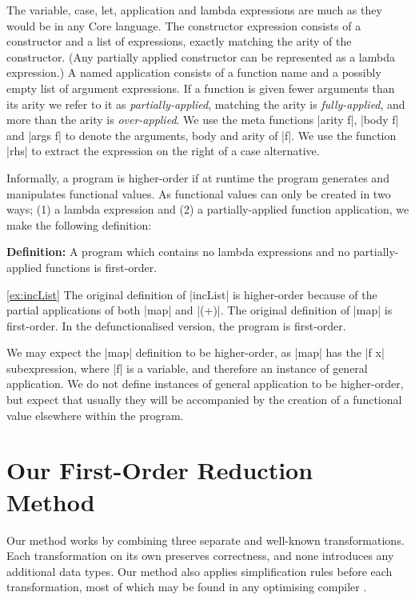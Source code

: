 \documentclass[preprint]{sigplanconf}
\newenvironment{definition}
    {\textbf{Definition:}}
    {\noexample}
\begin{document}
The variable, case, let, application and lambda expressions are much as they would be in any Core language. The constructor expression consists of a constructor and a list of expressions, exactly matching the arity of the constructor. (Any partially applied constructor can be represented as a lambda expression.) A named application consists of a function name and a possibly empty list of argument expressions. If a function is given fewer arguments than its arity we refer to it as \textit{partially-applied}, matching the arity is \textit{fully-applied}, and more than the arity is \textit{over-applied}. We use the meta functions |arity f|, |body f| and |args f| to denote the arguments, body and arity of |f|. We use the function |rhs| to extract the expression on the right of a case alternative.

Informally, a program is higher-order if at runtime the program generates and manipulates functional values. As functional values can only be created in two ways; (1) a lambda expression and (2) a partially-applied function application, we make the following definition:

\begin{definition}
A program which contains no lambda expressions and no partially-applied functions is first-order.
\end{definition}

\begin{examplerevisit}{\ref{ex:incList}}
The original definition of |incList| is higher-order because of the partial applications of both |map| and |(+)|. The original definition of |map| is first-order. In the defunctionalised version, the program is first-order.
\end{examplerevisit}

We may expect the |map| definition to be higher-order, as |map| has the |f x| subexpression, where |f| is a variable, and therefore an instance of general application. We do not define instances of general application to be higher-order, but expect that usually they will be accompanied by the creation of a functional value elsewhere within the program.

\section{Our First-Order Reduction Method}
\label{sec:overview}

Our method works by combining three separate and well-known transformations. Each transformation on its own preserves correctness, and none introduces any additional data types. Our method also applies simplification rules before each transformation, most of which may be found in any optimising compiler \cite{spj:transformation}.
\end{document}
